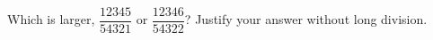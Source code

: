 Which is larger, $\dfrac{12345}{54321}$ or $\dfrac{12346}{54322}$? Justify your answer without long division.
